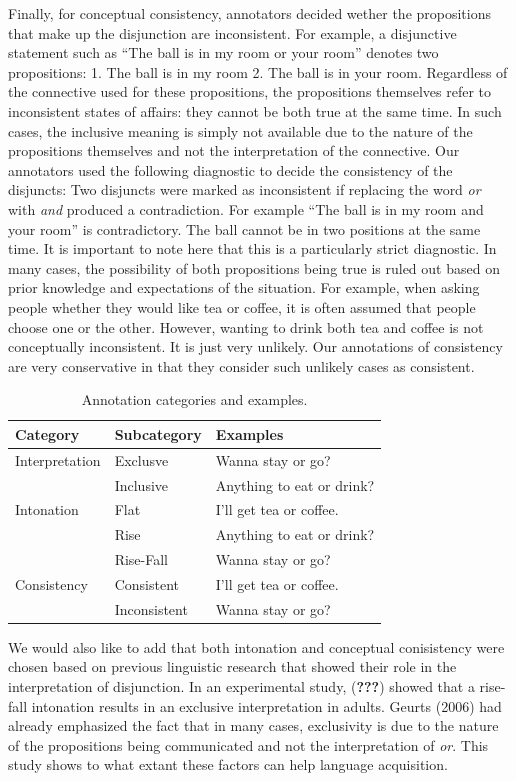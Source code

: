 \documentclass[10pt, letterpaper]{article}
\begin{document}
Finally, for conceptual consistency, annotators decided wether the
propositions that make up the disjunction are inconsistent. For example,
a disjunctive statement such as ``The ball is in my room or your room''
denotes two propositions: 1. The ball is in my room 2. The ball is in
your room. Regardless of the connective used for these propositions, the
propositions themselves refer to inconsistent states of affairs: they
cannot be both true at the same time. In such cases, the inclusive
meaning is simply not available due to the nature of the propositions
themselves and not the interpretation of the connective. Our annotators
used the following diagnostic to decide the consistency of the
disjuncts: Two disjuncts were marked as inconsistent if replacing the
word \emph{or} with \emph{and} produced a contradiction. For example
``The ball is in my room and your room'' is contradictory. The ball
cannot be in two positions at the same time. It is important to note
here that this is a particularly strict diagnostic. In many cases, the
possibility of both propositions being true is ruled out based on prior
knowledge and expectations of the situation. For example, when asking
people whether they would like tea or coffee, it is often assumed that
people choose one or the other. However, wanting to drink both tea and
coffee is not conceptually inconsistent. It is just very unlikely. Our
annotations of consistency are very conservative in that they consider
such unlikely cases as consistent.

\begin{table}[H]
\centering
\begin{tabular}{lll}
 Category & Subcategory & Examples \\ 
  \hline
Interpretation & Exclusve & Wanna stay or go? \\ 
   & Inclusive & Anything to eat or drink? \\ 
   \hline
Intonation & Flat & I'll get tea or coffee. \\ 
   & Rise & Anything to eat or drink? \\ 
   & Rise-Fall & Wanna stay or go? \\ 
   \hline
Consistency & Consistent & I'll get tea or coffee. \\ 
   & Inconsistent & Wanna stay or go? \\ 
  \end{tabular}
\caption{Annotation categories and examples.} 
\end{table}

We would also like to add that both intonation and conceptual
conisistency were chosen based on previous linguistic research that
showed their role in the interpretation of disjunction. In an
experimental study, ({\textbf{???}}) showed that a rise-fall intonation
results in an exclusive interpretation in adults. Geurts (2006) had
already emphasized the fact that in many cases, exclusivity is due to
the nature of the propositions being communicated and not the
interpretation of \emph{or}. This study shows to what extant these
factors can help language acquisition.
\end{document}
